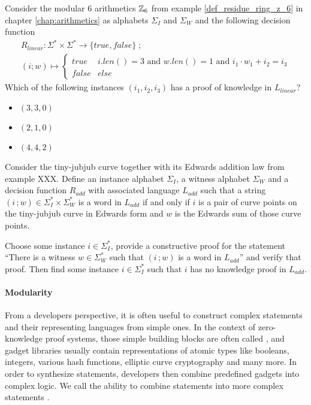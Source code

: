 \begin{exercise} Consider the modular $6$ arithmetics $\mathbb{Z}_6$ from example \ref{def_residue_ring_z_6} in chapter \ref{chap:arithmetics} as alphabets $\Sigma_I$ and $\Sigma_W$ and the following decision function
\begin{multline*}
R_{linear} : \Sigma^* \times \Sigma^* \to \{true, false\}\;;\;\\
(i;w) \mapsto
\begin{cases}
true & i.len()=3 \text{ and } w.len()=1 \text{ and } i_1\cdot w_1 + i_2 = i_3\\
false & else
\end{cases}
\end{multline*}
Which of the following instances $(i_1,i_2,i_3)$ has a proof of knowledge in $L_{linear}$? 
\begin{itemize}
\item $(3,3,0)$
\item $(2,1,0)$ 
\item $(4,4,2)$
\end{itemize}
\end{exercise}
\begin{exercise} Consider the tiny-jubjub curve together with its Edwards addition law from example XXX. Define an instance alphabet $\Sigma_I$, a witness alphabet $\Sigma_W$ and a decision function $R_{add}$ with associated language $L_{add}$ such that a string $(i\,;w)\in \Sigma_I^* \times \Sigma_W^*$ is a word in $L_{add}$ if and only if $i$ is a pair of curve points on the tiny-jubjub curve in Edwards form and $w$ is the Edwards sum of those curve points.

Choose some instance $i\in \Sigma_I^*$, provide a constructive proof for the statement ``There is a witness $w\in \Sigma_W^*$ such that $(i\,;w)$ is a word in $L_{add}$'' and verify that proof. Then find some instance $i\in \Sigma_I^*$ such that $i$ has no knowledge proof in $L_{add}$.
\end{exercise}
\paragraph{Modularity}\label{modularity} From a developers perspective, it is often useful to construct complex statements and their representing languages from simple ones. In the context of zero-knowledge proof systems, those simple building blocks are often called , and gadget libraries usually contain representations of atomic types like booleans, integers, various hash functions, elliptic curve cryptography and many more. In order to synthesize statements, developers then combine predefined gadgets into complex logic. We call the ability to combine statements into more complex statements . 

